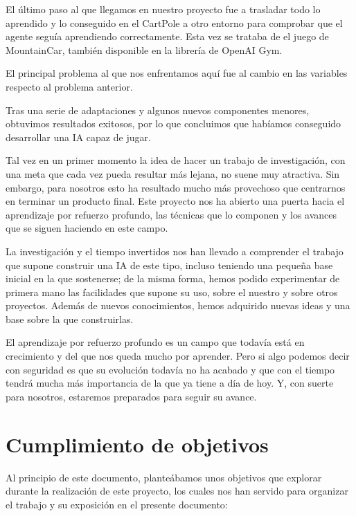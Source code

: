 El último paso al que llegamos en nuestro proyecto fue a trasladar todo lo aprendido y lo conseguido en el CartPole a otro entorno para comprobar que el agente seguía aprendiendo correctamente. Esta vez se trataba de el juego de MountainCar, también disponible en la librería de OpenAI Gym. 

El principal problema al que nos enfrentamos aquí fue al cambio en las variables respecto al problema anterior. 



Tras una serie de adaptaciones y algunos nuevos componentes menores, obtuvimos resultados exitosos, por lo que concluimos que habíamos conseguido desarrollar una IA capaz de jugar. 


Tal vez en un primer momento la idea de hacer un trabajo de investigación, con una meta que cada vez pueda resultar más lejana, no suene muy atractiva. Sin embargo, para nosotros esto ha resultado mucho más provechoso que centrarnos en terminar un producto final. Este proyecto nos ha abierto una puerta hacia el aprendizaje por refuerzo profundo, las técnicas que lo componen y los avances que se siguen haciendo en este campo. 

La investigación y el tiempo invertidos nos han llevado a comprender el trabajo que supone construir una IA de este tipo, incluso teniendo una pequeña base inicial en la que sostenerse; de la misma forma, hemos podido experimentar de primera mano las facilidades que supone su uso, sobre el nuestro y sobre otros proyectos. Además de nuevos conocimientos, hemos adquirido nuevas ideas y una base sobre la que construirlas. 

El aprendizaje por refuerzo profundo es un campo que todavía está en crecimiento y del que nos queda mucho por aprender. Pero si algo podemos decir con seguridad es que su evolución todavía no ha acabado y que con el tiempo tendrá mucha más importancia de la que ya tiene a día de hoy. Y, con suerte para nosotros, estaremos preparados para seguir su avance.

\section{Cumplimiento de objetivos}

Al principio de este documento, planteábamos unos objetivos que explorar durante la realización de este proyecto, los cuales nos han servido para organizar el trabajo y su exposición en el presente documento:

